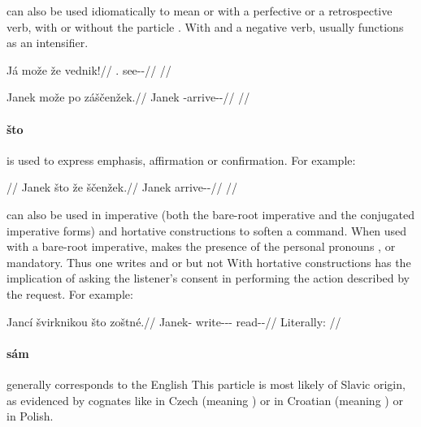  can also be used idiomatically to mean  or  with a perfective or a retrospective verb, with or without the particle
. With  and a negative verb,  usually functions as an
intensifier. 

\pex
\begingl
	\gla Já može že vednik!//
	\glb \Second{}.\Sg{} \Add{} \Ipfv{} see-\Pv{}-\Pf{}//
	\glft {}//
\endgl
\xe

\pex
\begingl
	\gla Janek može po záščenžek.//
	\glb Janek \Add{} \Ipfv{} \Neg{}-arrive-\Av{}-\Pf{}//
	\glft {}//
\endgl
\xe


\paragraph{što}  is used to express emphasis, affirmation or
confirmation. For example:

\pex
\begingl
	\glpreamble {}//
	\gla Janek što že ščenžek.//
	\glb Janek \Aff{} \Pfv{} arrive-\Av{}-\Pf{}//
	\glft {}//
\endgl
\xe

 can also be used in imperative (both the bare-root imperative and the
conjugated imperative forms) and hortative constructions to soften a command.
When used with a bare-root imperative,  makes the presence of the
personal pronouns ,  or
 mandatory. Thus one writes   and   or  but not  With hortative constructions  has the implication of asking the
listener's consent in performing the action described by the request. For
example:

\pex
\begingl
	\gla Jancí švirknikou što zoštné.//
	\glb Janek-\Gen{} write-\Pv{}-\Pf{}-\Nz{} \Aff{} read-\Pv{}-\Hort{}//
	\glft {} Literally: //
\endgl
\xe

\paragraph{sám}  generally corresponds to the English 
This particle is most likely of Slavic origin, as evidenced by cognates like
 in Czech (meaning ) or in Croatian (meaning
) or  in Polish.

